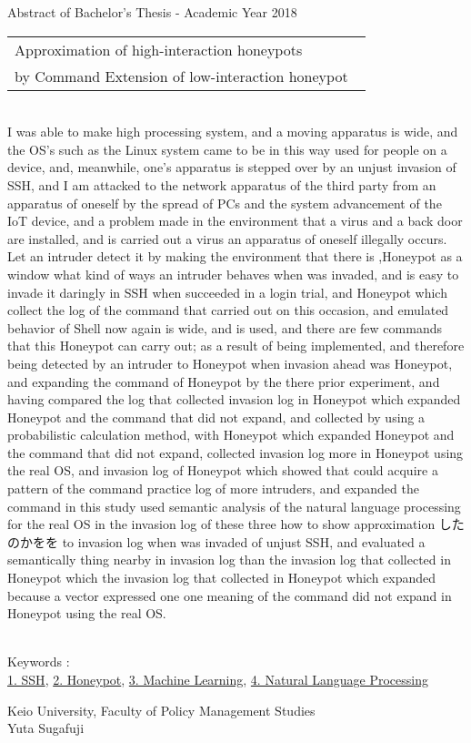 Abstract of Bachelor's Thesis - Academic Year 2018
\begin{center}
\begin{large}
\begin{tabular}{|p{0.97\linewidth}|}
    \hline
        Approximation of high-interaction honeypots\\
by Command Extension of low-interaction honeypot\\
    \hline
\end{tabular}
\end{large}
\end{center}

~ \\
\renewcommand{\baselinestretch}{0.9}
I was able to make high processing system, and a moving apparatus is wide, and the OS's such as the Linux system came to be in this way used for people on a device, and, meanwhile, one's apparatus is stepped over by an unjust invasion of SSH, and I am attacked to the network apparatus of the third party from an apparatus of oneself by the spread of PCs and the system advancement of the IoT device, and a problem made in the environment that a virus and a back door are installed, and is carried out a virus an apparatus of oneself illegally occurs.
Let an intruder detect it by making the environment that there is ,Honeypot as a window what kind of ways an intruder behaves when was invaded, and is easy to invade it daringly in SSH when succeeded in a login trial, and Honeypot which collect the log of the command that carried out on this occasion, and emulated behavior of Shell now again is wide, and is used, and there are few commands that this Honeypot can carry out; as a result of being implemented, and therefore being detected by an intruder to Honeypot when invasion ahead was Honeypot, and expanding the command of Honeypot by the there prior experiment, and having compared the log that collected invasion log in Honeypot which expanded Honeypot and the command that did not expand, and collected by using a probabilistic calculation method, with Honeypot which expanded Honeypot and the command that did not expand, collected invasion log more in Honeypot using the real OS, and invasion log of Honeypot which showed that could acquire a pattern of the command practice log of more intruders, and expanded the command in this study used semantic analysis of the natural language processing for the real OS in the invasion log of these three how to show approximation したのかをを to invasion log when was invaded of unjust SSH, and evaluated a semantically thing nearby in invasion log than the invasion log that collected in Honeypot which the invasion log that collected in Honeypot which expanded because a vector expressed one one meaning of the command did not expand in Honeypot using the real OS.
\renewcommand{\baselinestretch}{1.0}

~ \\
Keywords : \\
\underline{1. SSH},
\underline{2. Honeypot},
\underline{3. Machine Learning},
\underline{4. Natural Language Processing}
\begin{flushright}
Keio University, Faculty of Policy Management Studies\\
Yuta Sugafuji
\end{flushright}
